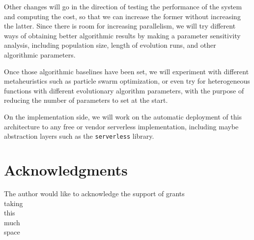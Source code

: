 \documentclass{llncs}
\begin{document}
  Other changes will go in the direction of testing the performance of
  the system and computing the cost, so that we can increase the former
  without increasing the latter. Since there is room for increasing
  parallelism, we will try different ways of obtaining better
  algorithmic results by making a parameter sensitivity analysis,
  including population size, length of evolution runs, and other
  algorithmic parameters.

  Once those algorithmic baselines have been set, we will experiment
  with different metaheuristics such as particle swarm optimization, or
  even try for heterogeneous functions with different evolutionary
  algorithm parameters, with the purpose of reducing the number of
  parameters to set at the start.

  On the implementation side, we will work on the automatic deployment
  of this architecture to any free or vendor serverless implementation,
  including maybe abstraction layers such as the {\tt serverless}
  library.




\section*{Acknowledgments}
    The author would like to acknowledge the support of grants\\
    taking\\
    this\\
    much\\
    space\\




  
  

  
\end{document}

